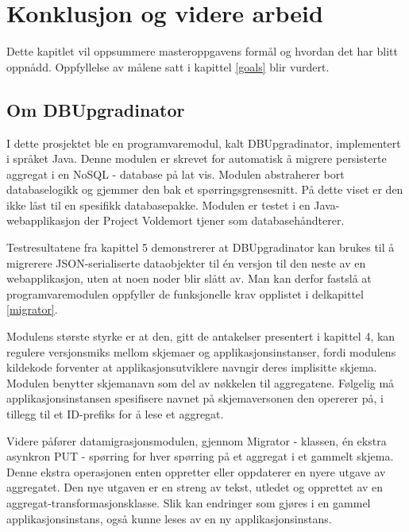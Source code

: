 
\chapter{Konklusjon og videre arbeid}

Dette kapitlet vil oppsummere masteroppgavens formål og hvordan det har blitt oppnådd. Oppfyllelse av målene satt i kapittel \ref{goals} blir vurdert.

\section{Om DBUpgradinator}

I dette prosjektet ble en programvaremodul, kalt DBUpgradinator, implementert i språket Java. Denne modulen er skrevet for automatisk å migrere persisterte aggregat i en NoSQL - database på lat vis. Modulen abstraherer bort databaselogikk og gjemmer den bak et spørringsgrensesnitt. På dette viset er den ikke låst til en spesifikk databasepakke. Modulen er testet i en Java-webapplikasjon der Project Voldemort tjener som databasehåndterer.

Testresultatene fra kapittel 5 demonstrerer at DBUpgradinator kan brukes til å migrerere JSON-serialiserte dataobjekter til én versjon til den neste av en webapplikasjon, uten at noen noder blir slått av. Man kan derfor fastslå at programvaremodulen oppfyller de funksjonelle krav opplistet i delkapittel \ref{migrator}.

Modulens største styrke er at den, gitt de antakelser presentert i kapittel 4, kan regulere versjonsmiks mellom skjemaer og applikasjonsinstanser, fordi modulens kildekode forventer at applikasjonsutviklere navngir deres implisitte skjema. Modulen benytter skjemanavn som del av nøkkelen til aggregatene.  Følgelig må applikasjonsinstansen spesifisere navnet på skjemaversonen den opererer på, i tillegg til et ID-prefiks for å lese et aggregat.

Videre påfører datamigrasjonsmodulen, gjennom Migrator - klassen, én ekstra asynkron PUT - spørring for hver spørring på et aggregat i et gammelt skjema. Denne ekstra operasjonen enten oppretter eller oppdaterer en nyere utgave av aggregatet. Den nye utgaven er en streng av tekst, utledet og opprettet av en aggregat-transformasjonsklasse. Slik kan endringer som gjøres i en gammel applikasjonsinstans, også kunne leses av en ny applikasjonsinstans.

